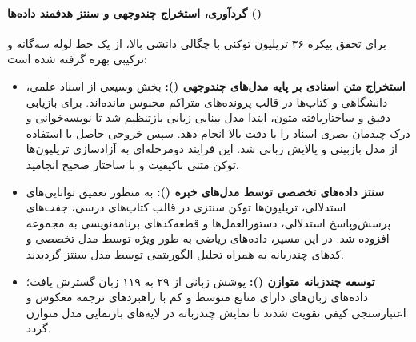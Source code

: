 \paragraph*{گردآوری، استخراج چندوجهی و سنتز هدفمند داده‌ها ()}
برای تحقق پیکره ۳۶ تریلیون توکنی با چگالی دانشی بالا، از یک خط لوله سه‌گانه و ترکیبی بهره گرفته شده است:
\begin{itemize}
    \item \textbf{استخراج متن اسنادی بر پایه مدل‌های چندوجهی ():} بخش وسیعی از اسناد علمی، دانشگاهی و کتاب‌ها در قالب پرونده‌های  متراکم محبوس مانده‌اند. برای بازیابی دقیق و ساختاریافته متون، ابتدا مدل بینایی-زبانی  \cite{bai2025qwen25vl} بازتنظیم شد تا نویسه‌خوانی و درک چیدمان بصری اسناد را با دقت بالا انجام دهد. سپس خروجی حاصل با استفاده از مدل  \cite{yang2024qwen25} بازبینی و پالایش زبانی شد. این فرایند دومرحله‌ای به آزادسازی تریلیون‌ها توکن متنی باکیفیت و با ساختار صحیح انجامید.
    \item \textbf{سنتز داده‌های تخصصی توسط مدل‌های خبره ():} به منظور تعمیق توانایی‌های استدلالی، تریلیون‌ها توکن سنتزی در قالب کتاب‌های درسی، جفت‌های پرسش‌وپاسخ استدلالی، دستورالعمل‌ها و قطعه‌کدهای برنامه‌نویسی به مجموعه افزوده شد. در این مسیر، داده‌های ریاضی به طور ویژه توسط مدل تخصصی  \cite{yang2024qwen25math} و کدهای چندزبانه به همراه تحلیل الگوریتمی توسط مدل  \cite{hui2024qwen25coder} سنتز گردیدند.
    \item \textbf{توسعه چندزبانه متوازن ():} پوشش زبانی از ۲۹ به ۱۱۹ زبان گسترش یافت؛ داده‌های زبان‌های دارای منابع متوسط و کم با راهبردهای ترجمه معکوس و اعتبارسنجی کیفی تقویت شدند تا نمایش چندزبانه در لایه‌های بازنمایی مدل متوازن گردد.
\end{itemize}

